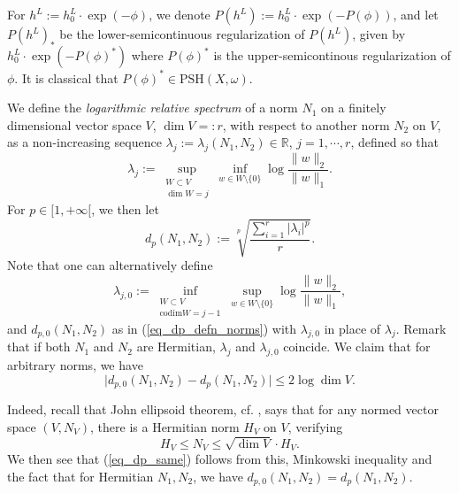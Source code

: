 \documentclass[12pt]{article}
\numberwithin{equation}{section}
\theoremstyle{theorem}
\theoremstyle{definition}
\theoremstyle{remark}
\newcommand{\real}{\mathbb{R}}
\begin{document}
	For $h^L := h^L_0 \cdot \exp(- \phi)$, we denote $P(h^L) := h^L_0 \cdot \exp(-P(\phi))$, and let $P(h^L)_*$ be the lower-semicontinuous regularization of $P(h^L)$, given by $h^L_0 \cdot \exp(-P(\phi)^*)$ where $P(\phi)^*$ is the upper-semicontinous regularization of $\phi$.
	It is classical that $P(\phi)^* \in {\textrm{PSH}}(X, \omega)$.
	\par 
	We define the \textit{logarithmic relative spectrum} of a norm $N_1$ on a finitely dimensional vector space $V$, $\dim V =: r$, with respect to another norm $N_2$ on $V$, as a non-increasing sequence $\lambda_j := \lambda_j(N_1, N_2) \in \real$, $j = 1, \cdots, r$, defined so that
	\begin{equation}\label{eq_log_rel_spec}
		\lambda_j
		:=
		\sup_{\substack{W \subset V \\ \dim W = j}} 
		\inf_{w \in W \setminus \{0\}} \log \frac{\| w \|_2}{\| w \|_1}.
	\end{equation}
	For $p \in [1, + \infty[$, we then let
	\begin{equation}\label{eq_dp_defn_norms}
		d_p(N_1, N_2) := \sqrt[p]{\frac{\sum_{i = 1}^{r} |\lambda_i|^p}{r}}.
	\end{equation} 
	Note that one can alternatively define 
	\begin{equation}\label{eq_log_rel_spec0}
		\lambda_{j, 0}
		:=
		\inf_{\substack{W \subset V \\ {\textrm{codim}} W = j - 1}} 
		\sup_{w \in W \setminus \{0\}} \log \frac{\| w \|_2}{\| w \|_1},
	\end{equation}
	and $d_{p, 0}(N_1, N_2)$ as in (\ref{eq_dp_defn_norms}) with $\lambda_{j, 0}$ in place of $\lambda_j$.
	Remark that if both $N_1$ and $N_2$ are Hermitian, $\lambda_j$ and $\lambda_{j, 0}$ coincide.
	We claim that for arbitrary norms, we have 
	\begin{equation}\label{eq_dp_same}
		\big| 
		d_{p, 0}(N_1, N_2) - d_{p}(N_1, N_2)
		\big|
		\leq
		2 \log \dim V.
	\end{equation}
	\par
	Indeed, recall that John ellipsoid theorem, cf. \cite[\S 3]{PisierBook}, says that for any normed vector space $(V, N_V)$, there is a Hermitian norm $H_V$ on $V$, verifying 
	\begin{equation}\label{eq_john_ellips}
		H_V \leq N_V \leq \sqrt{\dim V} \cdot H_V.
	\end{equation}
	We then see that (\ref{eq_dp_same}) follows from this, Minkowski inequality and the fact that for Hermitian $N_1, N_2$, we have $d_{p, 0}(N_1, N_2) = d_{p}(N_1, N_2)$.
\end{document}
